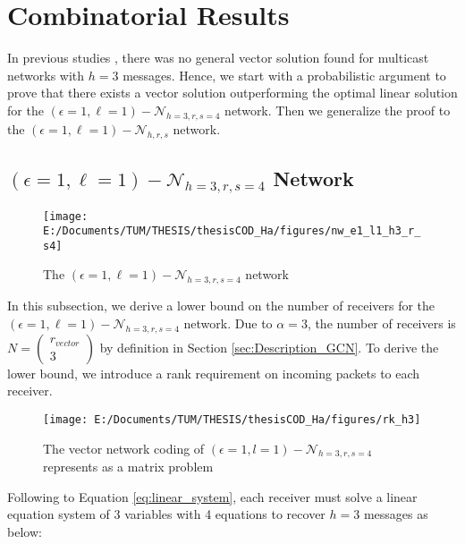 \chapter{Combinatorial Results} \label{chap:comb_res}

In previous studies \cite{Wachter-Zeh:2018}, there was no general
vector solution found for multicast networks with $h=3$ messages.
Hence, we start with a probabilistic argument to prove that there
exists a vector solution outperforming the optimal linear solution
for the $\left(\epsilon=1,\ell=1\right)-\mathcal{N}_{h=3,r,s=4}$
network. Then we generalize the proof to the $\left(\epsilon=1,\ell=1\right)-\mathcal{N}_{h,r,s}$
network.

\section{$\left(\epsilon=1,\ell=1\right)-\mathcal{N}_{h=3,r,s=4}$ Network
\label{sec:Network_e1l1h3rs4}}

\begin{figure}[H]
\caption{The $(\epsilon=1,\ell=1)-\mathcal{N}_{h=3,r,s=4}$ network\label{fig:nw_e1_l1_h3_r_s4}}

\centering{}\texttt{[image: E:/Documents/TUM/THESIS/thesisCOD\_Ha/figures/nw\_e1\_l1\_h3\_r\_s4]}
\end{figure}

In this subsection, we derive a lower bound on the number of receivers
for the $\left(\epsilon=1,\ell=1\right)-\mathcal{N}_{h=3,r,s=4}$
network. Due to $\alpha=3$, the number of receivers is $N=\left(\begin{array}{c}
r_{vector}\\
3
\end{array}\right)$ by definition in Section \ref{sec:Description_GCN}. To derive the
lower bound, we introduce a rank requirement on incoming packets to
each receiver. 

\begin{figure}[H]
\caption{The vector network coding of $(\epsilon=1,l=1)-\mathcal{N}_{h=3,r,s=4}$
represents as a matrix problem\label{fig:rk_h3}}

\centering{}\texttt{[image: E:/Documents/TUM/THESIS/thesisCOD\_Ha/figures/rk\_h3]}
\end{figure}

Following to Equation \ref{eq:linear_system}, each receiver must
solve a linear equation system of 3 variables with 4 equations to
recover $h=3$ messages as below:

